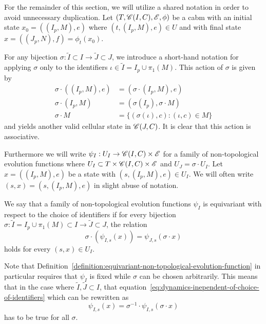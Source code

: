 For the remainder of this section, we will utilize a shared notation in order to avoid unnecessary
duplication.
Let $(T,\mathscr{C}(I,C),\mathscr{E},\phi)$ be a \ac{cabm} with an initial state $x_0=((I_p,M),e)$ where
$(t,(I_p,M),e)\in U$ and with final state $x=((J_p,N),f)=\phi_t(x_0)$.

For any bijection $\sigma:\tilde{I}\subset I\rightarrow\tilde{J}\subset J$, we introduce a
short-hand notation for applying $\sigma$ only to the identifiers
$\iota\in\tilde{I}=I_p\cup\pi_1(M)$.
This action of $\sigma$ is given by
\begin{align}
    \sigma\cdot ((I_p,M),e) &= (\sigma\cdot(I_p,M),e)\\
    \sigma\cdot (I_p,M) &= (\sigma(I_p),\sigma\cdot M)\\
    \sigma\cdot M &= \{(\sigma(\iota),c):(\iota,c)\in M\}
\end{align}
and yields another valid cellular state in $\mathscr{C}(J,C)$.
It is clear that this action is associative.

Furthermore we will write $\psi_I:U_I\rightarrow\mathscr{C}(I,C)\times\mathscr{E}$ for a family of non-topological
evolution functions where $U_I\subset T\times\mathscr{C}(I,C)\times\mathscr{E}$ and $U_J=\sigma\cdot U_I$.
Let $x=((I_p,M),e)$ be a state with $(s,(I_p,M),e)\in U_I$.
We will often write $(s,x)=(s,(I_p,M),e)$ in slight abuse of notation.

\begin{definition}
    We say that a family of non-topological evolution functions $\psi_I$ is equivariant with respect
    to the choice of identifiers if for every bijection
    $\sigma:\tilde{I}=I_p\cup\pi_1(M)\subset I\rightarrow\tilde{J}\subset J$, the relation
    \begin{equation}
        \sigma\cdot(\psi_{I,s}(x)) = \psi_{J,s}(\sigma\cdot x)
        \label{eq:dynamics-inependent-of-choice-of-identifiers}
    \end{equation}
    holds for every $(s,x)\in U_I$.
    \label{definition:equivariant-non-topological-evolution-function}
\end{definition}

Note that Definition~\ref{definition:equivariant-non-topological-evolution-function} in particular
requires that $\psi_I$ is fixed while $\sigma$ can be chosen arbitrarily.
This means that in the case where $\tilde{I},\tilde{J}\subset I$, that
equation~\eqref{eq:dynamics-inependent-of-choice-of-identifiers} which can be rewritten as
\begin{equation}
    \psi_{I,s}(x) = \sigma^{-1}\cdot\psi_{I,s}(\sigma\cdot x)
\end{equation}
has to be true for all $\sigma$.

